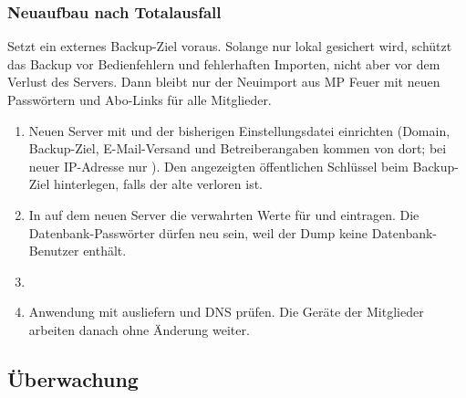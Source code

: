 \subsubsection*{Neuaufbau nach Totalausfall}

Setzt ein externes Backup-Ziel voraus. Solange nur lokal gesichert wird,
schützt das Backup vor Bedienfehlern und fehlerhaften Importen, nicht aber
vor dem Verlust des Servers. Dann bleibt nur der Neuimport aus MP Feuer mit
neuen Passwörtern und Abo-Links für alle Mitglieder.

\begin{enumerate}
  \item Neuen Server mit  und der
        bisherigen Einstellungsdatei einrichten (Domain, Backup-Ziel,
        E-Mail-Versand und Betreiberangaben kommen von dort; bei neuer
        IP-Adresse nur ). Den angezeigten öffentlichen
        Schlüssel beim Backup-Ziel hinterlegen, falls der alte verloren ist.
  \item In  auf dem neuen Server die verwahrten
        Werte für  und  eintragen. Die
        Datenbank-Passwörter dürfen neu sein, weil der Dump keine
        Datenbank-Benutzer enthält.
  \item {}
  \item Anwendung mit  ausliefern und DNS prüfen. Die Geräte der
        Mitglieder arbeiten danach ohne Änderung weiter.
\end{enumerate}

\subsection{Überwachung}

